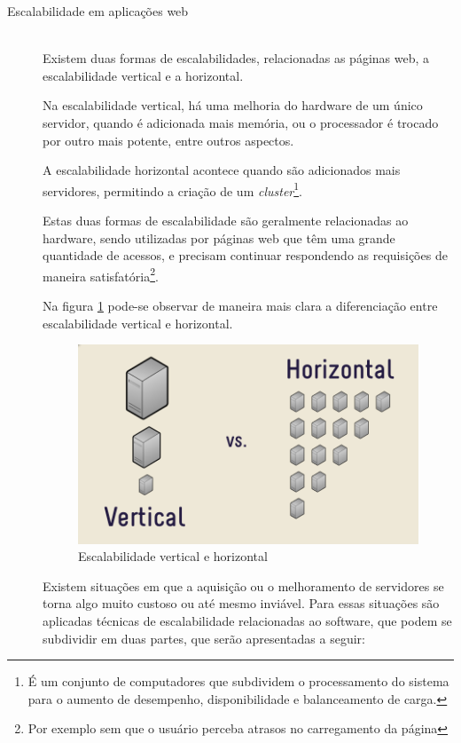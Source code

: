 \begin{description}
\item[Escalabilidade em aplicações web] \hfill \\
Existem duas formas de escalabilidades, relacionadas as páginas web, a escalabilidade vertical e a horizontal.

Na escalabilidade vertical, há uma melhoria do hardware de um único servidor, quando é adicionada mais memória, ou o processador é trocado por outro mais potente, entre outros aspectos. 

A escalabilidade horizontal acontece quando são adicionados mais servidores, permitindo a criação de um \textit{cluster}\footnote{É um conjunto de computadores que subdividem o processamento do sistema para o aumento de desempenho, disponibilidade e balanceamento de carga.}. 

Estas duas formas de escalabilidade são geralmente relacionadas ao hardware, sendo utilizadas por páginas web que têm uma grande quantidade de acessos, e precisam continuar respondendo as requisições de maneira satisfatória\footnote{Por exemplo sem que o usuário perceba atrasos no carregamento da página}. 

Na figura \ref{fig: Escalabilidade vertical e horizontal}  pode-se observar de maneira mais clara a diferenciação entre escalabilidade vertical e horizontal.

\begin{figure}[htb]
\centering
\includegraphics[scale=0.45]{images/scal_vh.png}
\caption{Escalabilidade vertical e horizontal \cite{ScalabVH}}
\label{fig: Escalabilidade vertical e horizontal}
\end{figure}

\newpage

Existem  situações em que a aquisição ou o melhoramento de servidores se torna algo muito custoso ou até mesmo inviável. Para essas situações são aplicadas técnicas de escalabilidade relacionadas ao software, que podem se subdividir em duas partes, que serão apresentadas a seguir:


\end{description}
